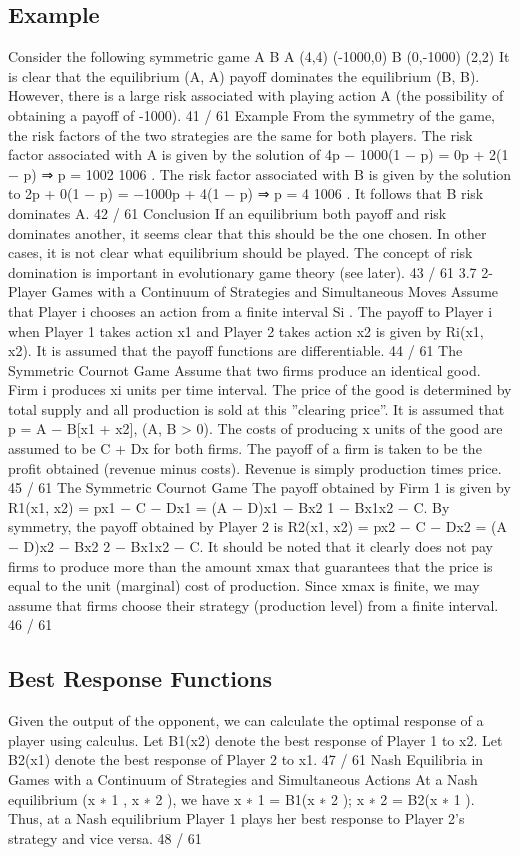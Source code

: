 \documentclass[]{report}
\begin{document}
\subsection{Example}
Consider the following symmetric game
A B
A (4,4) (-1000,0)
B (0,-1000) (2,2)
It is clear that the equilibrium (A, A) payoff dominates the
equilibrium (B, B). However, there is a large risk associated with
playing action A (the possibility of obtaining a payoff of -1000).
41 / 61
Example
From the symmetry of the game, the risk factors of the two
strategies are the same for both players.
The risk factor associated with A is given by the solution of
4p − 1000(1 − p) = 0p + 2(1 − p) ⇒ p =
1002
1006
.
The risk factor associated with B is given by the solution to
2p + 0(1 − p) = −1000p + 4(1 − p) ⇒ p =
4
1006
.
It follows that B risk dominates A.
42 / 61
Conclusion
If an equilibrium both payoff and risk dominates another, it seems
clear that this should be the one chosen.
In other cases, it is not clear what equilibrium should be played.
The concept of risk domination is important in evolutionary game
theory (see later).
43 / 61
3.7 2-Player Games with a Continuum of Strategies and
Simultaneous Moves
Assume that Player i chooses an action from a finite interval Si
.
The payoff to Player i when Player 1 takes action x1 and Player 2
takes action x2 is given by Ri(x1, x2).
It is assumed that the payoff functions are differentiable.
44 / 61
The Symmetric Cournot Game
Assume that two firms produce an identical good. Firm i produces
xi units per time interval.
The price of the good is determined by total supply and all
production is sold at this ”clearing price”. It is assumed that
p = A − B[x1 + x2], (A, B > 0).
The costs of producing x units of the good are assumed to be
C + Dx for both firms.
The payoff of a firm is taken to be the profit obtained (revenue
minus costs). Revenue is simply production times price.
45 / 61
The Symmetric Cournot Game
The payoff obtained by Firm 1 is given by
R1(x1, x2) = px1 − C − Dx1 = (A − D)x1 − Bx2
1 − Bx1x2 − C.
By symmetry, the payoff obtained by Player 2 is
R2(x1, x2) = px2 − C − Dx2 = (A − D)x2 − Bx2
2 − Bx1x2 − C.
It should be noted that it clearly does not pay firms to produce
more than the amount xmax that guarantees that the price is equal
to the unit (marginal) cost of production. Since xmax is finite, we
may assume that firms choose their strategy (production level)
from a finite interval.
46 / 61
\subsection{Best Response Functions}
Given the output of the opponent, we can calculate the optimal
response of a player using calculus.
Let B1(x2) denote the best response of Player 1 to x2.
Let B2(x1) denote the best response of Player 2 to x1.
47 / 61
Nash Equilibria in Games with a Continuum of Strategies
and Simultaneous Actions
At a Nash equilibrium (x
∗
1
, x
∗
2
), we have
x
∗
1 = B1(x
∗
2
); x
∗
2 = B2(x
∗
1
).
Thus, at a Nash equilibrium Player 1 plays her best response to
Player 2’s strategy and vice versa.
48 / 61
\end{document}

